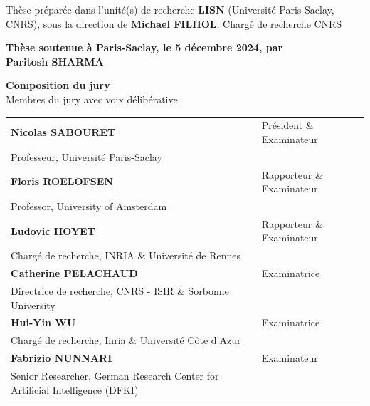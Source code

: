 \documentclass[english,12pt,a4paper]{book}
\begin{document}
\begin{titlepage}
\footnotesize Thèse préparée dans l'unité(s) de recherche \textbf{LISN} (Université Paris-Saclay, CNRS), sous la direction de \textbf{Michael FILHOL}, Chargé de recherche CNRS \\
\vspace{15mm}

\textbf{Thèse soutenue à Paris-Saclay, le 5 décembre 2024, par}\\
\bigskip
\Large {\color{Prune} \textbf{Paritosh SHARMA}} %

\vspace{\fill} %

\bigskip

\flushleft
\small {\color{Prune} \textbf{Composition du jury}}\\
{\color{Prune} \scriptsize {Membres du jury avec voix délibérative}} \\
\vspace{2mm}
\scriptsize
\begin{tabular}{|p{7cm}l}
\arrayrulecolor{Prune}
\textbf{Nicolas SABOURET} & Président \& Examinateur\\ 
Professeur, Université Paris-Saclay \\
\textbf{Floris ROELOFSEN} &  Rapporteur \& Examinateur \\ 
Professor, University of Amsterdam \\ 
\textbf{Ludovic HOYET} &  Rapporteur \& Examinateur \\ 
Chargé de recherche, INRIA \& Université de Rennes \\ 
\textbf{Catherine PELACHAUD} &  Examinatrice \\ 
Directrice de recherche, CNRS - ISIR \& Sorbonne University \\ 
\textbf{Hui-Yin WU} &  Examinatrice \\ 
Chargé de recherche, Inria \& Université Côte d'Azur \\ 
\textbf{Fabrizio NUNNARI} &  Examinateur \\ 
Senior Researcher, German Research Center for Artificial Intelligence (DFKI) \\ 
 

\end{tabular} 

\end{titlepage}


\thispagestyle{empty}
\selectfont
\end{document}
